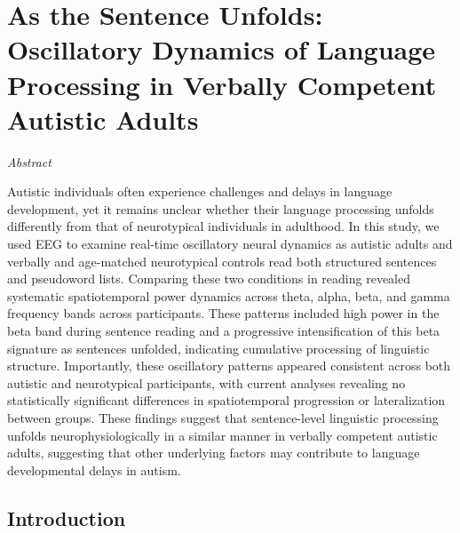\chapter{As the Sentence Unfolds: Oscillatory Dynamics of Language Processing in Verbally Competent Autistic Adults}
\label{ch:language_asc}

\begin{center}
    \large\textit{Abstract}
\end{center} 

{\abstractfont 
Autistic individuals often experience challenges and delays in language development, yet it remains unclear whether their language processing unfolds differently from that of neurotypical individuals in adulthood. In this study, we used EEG to examine real-time oscillatory neural dynamics as autistic adults and verbally and age-matched neurotypical controls read both structured sentences and pseudoword lists. Comparing these two conditions in reading revealed systematic spatiotemporal power dynamics across theta, alpha, beta, and gamma frequency bands across participants. These patterns included high power in the beta band during sentence reading and a progressive intensification of this beta signature as sentences unfolded, indicating cumulative processing of linguistic structure. Importantly, these oscillatory patterns appeared consistent across both autistic and neurotypical participants, with current analyses revealing no statistically significant differences in spatiotemporal progression or lateralization between groups. These findings suggest that sentence-level linguistic processing unfolds neurophysiologically in a similar manner in verbally competent autistic adults, suggesting that other underlying factors may contribute to language developmental delays in autism. \par
} 

\vspace{2cm}

\thispagestyle{empty}

\newpage

\section{Introduction}

